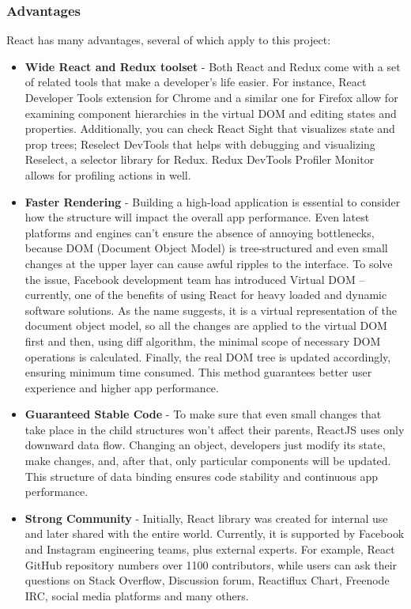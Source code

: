 \subsubsection{Advantages}
React has many advantages, several of which apply to this project:

\begin{itemize}
    \item \textbf{Wide React and Redux toolset} - Both React and Redux come with a set of related tools that make a developer’s life easier. For instance, React Developer Tools extension for Chrome and a similar one for Firefox allow for examining component hierarchies in the virtual DOM and editing states and properties. Additionally, you can check React Sight that visualizes state and prop trees; Reselect DevTools that helps with debugging and visualizing Reselect, a selector library for Redux. Redux DevTools Profiler Monitor allows for profiling actions in well.
    \item \textbf{Faster Rendering} - Building a high-load application is essential to consider how the structure will impact the overall app performance. Even latest platforms and engines can't ensure the absence of annoying bottlenecks, because DOM (Document Object Model) is tree-structured and even small changes at the upper layer can cause awful ripples to the interface. To solve the issue, Facebook development team has introduced Virtual DOM – currently, one of the benefits of using React for heavy loaded and dynamic software solutions. As the name suggests, it is a virtual representation of the document object model, so all the changes are applied to the virtual DOM first and then, using diff algorithm, the minimal scope of necessary DOM operations is calculated. Finally, the real DOM tree is updated accordingly, ensuring minimum time consumed. This method guarantees better user experience and higher app performance.
    \item \textbf{Guaranteed Stable Code} - To make sure that even small changes that take place in the child structures won't affect their parents, ReactJS uses only downward data flow. Changing an object, developers just modify its state, make changes, and, after that, only particular components will be updated. This structure of data binding ensures code stability and continuous app performance.
    \item \textbf{Strong Community} - Initially, React library was created for internal use and later shared with the entire world. Currently, it is supported by Facebook and Instagram engineering teams, plus external experts. For example, React GitHub repository numbers over 1100 contributors, while users can ask their questions on Stack Overflow, Discussion forum, Reactiflux Chart, Freenode IRC, social media platforms and many others.
\end{itemize}

